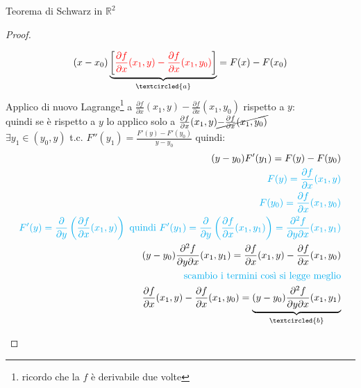 \documentclass{article}  %
\begin{document}
\begin{theorem}{Teorema di Schwarz in $\mathbb{R}^2$}
\begin{proof}
\begin{enumerate}
\begin{itemize}
\begin{align*}
					            (x-x_0)\underbrace{\left[\textcolor{red}{\frac{\partial f}{\partial x}(x_1,y)-\frac{\partial f}{\partial x}(x_1,y_0)}\right]}_{\textcircled{a}}=F(x)-F(x_0)
				            \end{align*}
				            Applico di nuovo Lagrange\footnote{ricordo che la $f$ è derivabile due volte} a $\frac{\partial f}{\partial x}(x_1,y)-\frac{\partial f}{\partial x}(x_1,y_0)$ rispetto a $y$: \\
				            quindi se è rispetto a $y$ lo applico solo a $\frac{\partial f}{\partial x}(x_1,y)\cancel{-\frac{\partial f}{\partial x}(x_1,y_0)}$ \\
				            $\exists y_1 \in (y_0,y)$ t.c. $F''(y_1)=\frac{F'(y)-F'(y_0)}{y-y_0}$ quindi:
				            \begin{align*}
					            (y-y_0)F'(y_1)=F(y)-F(y_0)                                                                                                                                              \\
					            \textcolor{cyan}{F(y)=\frac{\partial f}{\partial x}(x_1,y)}                                                                                                             \\
					            \textcolor{cyan}{F(y_0)=\frac{\partial f}{\partial x}(x_1,y_0)}                                                                                                         \\
					            \textcolor{cyan}{F'(y)= \frac{\partial}{\partial y} \left(\frac{\partial f}{\partial x}(x_1,y)\right) \text{ quindi }
					            F'(y_1)= \frac{\partial}{\partial y} \left(\frac{\partial f}{\partial x}(x_1,y_1)\right) = \frac{\partial^2 f}{\partial y \partial x}(x_1,y_1)}                         \\
					            (y-y_0)\frac{\partial^2 f}{\partial y \partial x}(x_1,y_1)=\frac{\partial f}{\partial x}(x_1,y)-\frac{\partial f}{\partial x}(x_1,y_0)                                  \\
					            \textcolor{cyan}{\text{scambio i termini così si legge meglio}}                                                                                                         \\
					            \frac{\partial f}{\partial x}(x_1,y)-\frac{\partial f}{\partial x}(x_1,y_0) = \underbrace{(y-y_0)\frac{\partial^2 f}{\partial y \partial x}(x_1,y_1)}_{\textcircled{b}} \\
				            \end{align*}

\end{itemize}
\end{enumerate}
\end{proof}
\end{theorem}
\end{document}
